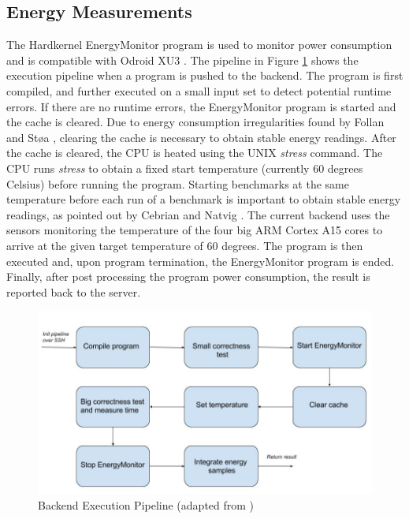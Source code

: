 \subsection{Energy Measurements}
\label{sec:em-cmb}
The Hardkernel EnergyMonitor program is used to monitor power consumption and is compatible with Odroid XU3 \cite{OEM}. The pipeline in Figure \ref{fig:execution-pipeline} shows the execution pipeline when a program is pushed to the backend. The program is first compiled, and further executed on a small input set to detect potential runtime errors. If there are no runtime errors, the EnergyMonitor program is started and the cache is cleared. Due to energy consumption irregularities found by Follan and Støa \cite{mt:T&S}, clearing the cache is necessary to obtain stable energy readings. After the cache is cleared, the CPU is heated using the UNIX \textit{stress} \cite{STRESS} command. The CPU runs \textit{stress} to obtain a fixed start temperature (currently 60 degrees Celsius) before running the program. Starting benchmarks at the same temperature before each run of a benchmark is important to obtain stable energy readings, as pointed out by Cebrian and Natvig \cite{a:JL:T}. The current backend uses the sensors monitoring the temperature of the four big ARM Cortex A15 cores to arrive at the given target temperature of 60 degrees. The program is then executed and, upon program termination, the EnergyMonitor program is ended. Finally, after post processing the program power consumption, the result is reported back to the server. \\

\begin{figure}
  \includegraphics[width=1.0\textwidth]{figs/execution_pipeline.jpg}
  \caption[Backend Execution Pipeline]{Backend Execution Pipeline (adapted from \cite{mt:T&S})}
  \label{fig:execution-pipeline}
\end{figure}


